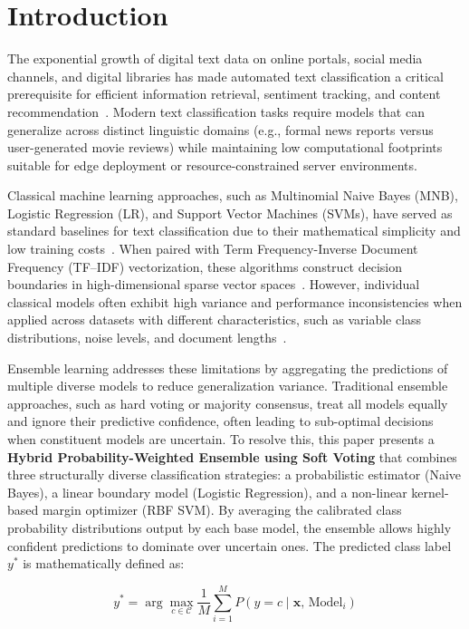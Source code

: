 \documentclass[conference]{IEEEtran}
\begin{document}
\section{Introduction}

The exponential growth of digital text data on online portals, social media channels, and digital libraries has made automated text classification a critical prerequisite for efficient information retrieval, sentiment tracking, and content recommendation~\cite{ref7,ref3}. Modern text classification tasks require models that can generalize across distinct linguistic domains (e.g., formal news reports versus user-generated movie reviews) while maintaining low computational footprints suitable for edge deployment or resource-constrained server environments.

Classical machine learning approaches, such as Multinomial Naive Bayes (MNB), Logistic Regression (LR), and Support Vector Machines (SVMs), have served as standard baselines for text classification due to their mathematical simplicity and low training costs~\cite{ref10,ref3}. When paired with Term Frequency-Inverse Document Frequency (TF--IDF) vectorization, these algorithms construct decision boundaries in high-dimensional sparse vector spaces~\cite{ref7}. However, individual classical models often exhibit high variance and performance inconsistencies when applied across datasets with different characteristics, such as variable class distributions, noise levels, and document lengths~\cite{ref1}.

Ensemble learning addresses these limitations by aggregating the predictions of multiple diverse models to reduce generalization variance. Traditional ensemble approaches, such as hard voting or majority consensus, treat all models equally and ignore their predictive confidence, often leading to sub-optimal decisions when constituent models are uncertain. To resolve this, this paper presents a \textbf{Hybrid Probability-Weighted Ensemble using Soft Voting} that combines three structurally diverse classification strategies: a probabilistic estimator (Naive Bayes), a linear boundary model (Logistic Regression), and a non-linear kernel-based margin optimizer (RBF SVM). By averaging the calibrated class probability distributions output by each base model, the ensemble allows highly confident predictions to dominate over uncertain ones. The predicted class label $y^*$ is mathematically defined as:

\begin{equation}
  y^* = \arg\max_{c \in \mathcal{C}} \frac{1}{M} \sum_{i=1}^{M} P\!\left(y = c \mid \mathbf{x},\, \text{Model}_i\right)
  \label{eq:softvote}
\end{equation}
\end{document}
